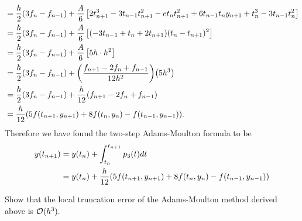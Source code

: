 \documentclass[12pt]{report}
\begin{document}
\begin{solution}
\begin{align*}
        &= \frac{h}{2}{\left(3f_n - f_{n-1}\right)} + \frac{A}{6}\left[ 2t_{n+1}^3 - 3t_{n-1}t_{n+1}^2 - et_n t_{n+1}^2 + 6t_{n-1}t_n y_{n+1} + t_n^3 - 3t_{n-1}t_n^2\right]\\
        &= \frac{h}{2}{\left(3f_n - f_{n-1}\right)} + \frac{A}{6}\left[ (-3t_{n-1} + t_n + 2t_{n+1})(t_n - t_{n+1})^2\right]\\
        &= \frac{h}{2}{\left(3f_n - f_{n-1}\right)} + \frac{A}{6}\left[ 5h \cdot h^2\right]\\
        &=  \frac{h}{2}{\left(3f_n - f_{n-1}\right)} + {\left(\frac{f_{n+1} - 2f_n + f_{n-1}}{12h^2}\right)}{\left(5h^3\right)}\\
        &= \frac{h}{2}{\left(3f_n - f_{n-1}\right)} + \frac{h}{12}{\left(f_{n+1} - 2f_{n} + f_{n-1}\right)}\\
        &= \frac{h}{12}{\left(5f(t_{n+1},y_{n+1}) + 8f(t_n, y_n) - f(t_{n-1},y_{n-1})\right)}.
    \end{align*}
    Therefore we have found the two-step Adams-Moulton formula to be
    \begin{align*}
        y(t_{n+1}) &= y(t_n)+ \int_{t_n}^{t_{n+1}}p_3(t)dt\\
        &= y(t_n) + \frac{h}{12}{\left(5f(t_{n+1},y_{n+1}) + 8f(t_n, y_n) - f(t_{n-1},y_{n-1})\right)}
    \end{align*}
\end{solution}

\newpage



\begin{problem}
    Show that the local truncation error of the Adams-Moulton method derived above is ${\mathcal{O}}(h^3).$
\end{problem}
\end{document}

